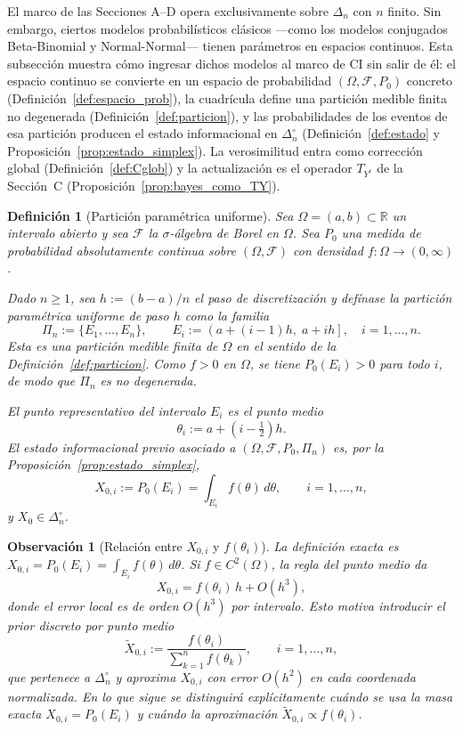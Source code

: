 ﻿\documentclass[12pt]{article}
\newtheorem{definicion}{Definición}[section]
\newtheorem{observacion}{Observación}[section]
\begin{document}
El marco de las Secciones A--D opera exclusivamente sobre $\Delta_n$ con $n$ finito. Sin embargo, ciertos modelos probabilísticos clásicos ---como los modelos conjugados Beta-Binomial y Normal-Normal--- tienen parámetros en espacios continuos. Esta subsección muestra cómo ingresar dichos modelos al marco de CI sin salir de él: el espacio continuo se convierte en un espacio de probabilidad $(\Omega,\mathcal{F},P_0)$ concreto (Definición~\ref{def:espacio_prob}), la cuadrícula define una partición medible finita no degenerada (Definición~\ref{def:particion}), y las probabilidades de los eventos de esa partición producen el estado informacional en $\Delta_n^\circ$ (Definición~\ref{def:estado} y Proposición~\ref{prop:estado_simplex}). La verosimilitud entra como corrección global (Definición~\ref{def:Cglob}) y la actualización es el operador $T_{Y^\ell}$ de la Sección~C (Proposición~\ref{prop:bayes_como_TY}).

\begin{definicion}[Partición paramétrica uniforme]\label{def:particion_parametrica}
Sea $\Omega = (a,b) \subset \mathbb{R}$ un intervalo abierto y sea $\mathcal{F}$ la $\sigma$-álgebra de Borel en $\Omega$. Sea $P_0$ una medida de probabilidad absolutamente continua sobre $(\Omega,\mathcal{F})$ con densidad $f:\Omega\to(0,\infty)$.

Dado $n\geq 1$, sea $h:=(b-a)/n$ el paso de discretización y defínase la \emph{partición paramétrica uniforme} de paso $h$ como la familia
\[
\Pi_n := \{E_1,\dots,E_n\},
\qquad
E_i := \left(a+(i-1)h,\; a+ih\right], \quad i=1,\dots,n.
\]
Esta es una partición medible finita de $\Omega$ en el sentido de la Definición~\ref{def:particion}. Como $f>0$ en $\Omega$, se tiene $P_0(E_i)>0$ para todo $i$, de modo que $\Pi_n$ es no degenerada.

El \emph{punto representativo} del intervalo $E_i$ es el punto medio
\[
\theta_i := a + \left(i-\tfrac{1}{2}\right)h.
\]
El \emph{estado informacional previo} asociado a $(\Omega,\mathcal{F},P_0,\Pi_n)$ es, por la Proposición~\ref{prop:estado_simplex},
\[
X_{0,i} := P_0(E_i) = \int_{E_i} f(\theta)\,d\theta, \qquad i=1,\dots,n,
\]
y $X_0 \in \Delta_n^\circ$.
\end{definicion}

\begin{observacion}[Relación entre $X_{0,i}$ y $f(\theta_i)$]\label{obs:aprox_midpoint}
La definición exacta es $X_{0,i} = P_0(E_i) = \int_{E_i} f(\theta)\,d\theta$. Si $f\in C^2(\Omega)$, la regla del punto medio da
\[
X_{0,i} = f(\theta_i)\,h + O(h^3),
\]
donde el error local es de orden $O(h^3)$ por intervalo. Esto motiva introducir el \emph{prior discreto por punto medio}
\[
\widetilde X_{0,i} := \frac{f(\theta_i)}{\displaystyle\sum_{k=1}^n f(\theta_k)},
\qquad i=1,\dots,n,
\]
que pertenece a $\Delta_n^\circ$ y aproxima $X_{0,i}$ con error $O(h^2)$ en cada coordenada normalizada. En lo que sigue se distinguirá explícitamente cuándo se usa la masa exacta $X_{0,i}=P_0(E_i)$ y cuándo la aproximación $\widetilde X_{0,i}\propto f(\theta_i)$.
\end{observacion}
\end{document}
